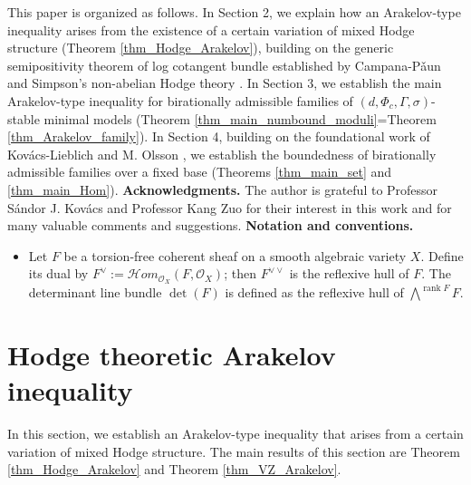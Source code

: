 \documentclass[11pt,letterpaper]{amsart}
\numberwithin{equation}{section}
\begin{document}
	This paper is organized as follows. In Section 2, we explain how an Arakelov-type inequality arises from the existence of a certain variation of mixed Hodge structure (Theorem \ref{thm_Hodge_Arakelov}), building on the generic semipositivity theorem of log cotangent bundle established by Campana-P\v{a}un \cite{CP2019} and Simpson's non-abelian Hodge theory \cite{Simpson1990}. In Section 3, we establish the main Arakelov-type inequality for birationally admissible families of $(d,\Phi_c,\Gamma,\sigma)$-stable minimal models (Theorem \ref{thm_main_numbound_moduli}=Theorem \ref{thm_Arakelov_family}). In Section 4, building on the foundational work of Kov\'acs-Lieblich \cite{Kovacs2011} and M. Olsson \cite{Olsson2007}, we establish the boundedness of birationally admissible families over a fixed base (Theorems \ref{thm_main_set} and \ref{thm_main_Hom}).
	\newline
	\newline
	\textbf{Acknowledgments.} The author is grateful to Professor S\'{a}ndor J. Kov\'{a}cs and Professor Kang Zuo for their interest in this work and for many valuable comments and suggestions.
	\newline
	\newline
	\textbf{Notation and conventions.}
	\begin{itemize}
		\item Let $F$ be a torsion-free coherent sheaf on a smooth algebraic variety $X$. Define its dual by $F^\vee := \mathcal{H}om_{\mathcal{O}_X}(F, \mathcal{O}_X)$; then $F^{\vee\vee}$ is the reflexive hull of $F$. The determinant line bundle $\det(F)$ is defined as the reflexive hull of $\bigwedge^{\operatorname{rank} F} F$.
	\end{itemize}

	
\section{Hodge theoretic Arakelov inequality}
In this section, we establish an Arakelov-type inequality that arises from a certain variation of mixed Hodge structure. The main results of this section are Theorem \ref{thm_Hodge_Arakelov} and Theorem \ref{thm_VZ_Arakelov}.  
\end{document}
